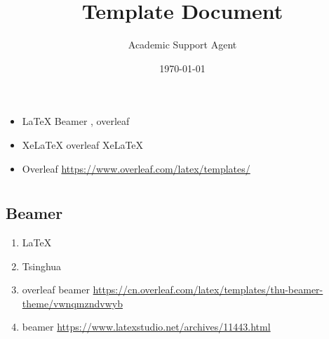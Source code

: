 \documentclass{article}
\title{Template Document}
\author{Academic Support Agent}
\date{\today}
\begin{document}
\maketitle

%  
    \kaishu {}
	
	\begin{frame}
		\titlepage
	\end{frame}
	
	\begin{frame}
		
	\end{frame}
		
	
	\section{ }
	
		\begin{frame}
			\begin{itemize}[<+-| alert@+>] 
				\item  \LaTeX{} Beamer ,  overleaf 
				\item   Xe\LaTeX{}   \qquad  overleaf  Xe\LaTeX{} 
				\item Overleaf  \url{https://www.overleaf.com/latex/templates/} 
			\end{itemize}
		\end{frame}
	
	\section{ }
	    \subsection{Beamer }	
	    
		\begin{frame}
			\begin{enumerate}
				\item<1->   \LaTeX{}  
				\item<2->  Tsinghua 
				\item<3->  overleaf beamer  \newline \url{https://cn.overleaf.com/latex/templates/thu-beamer-theme/vwnqmzndvwyb}
				\item<4->  beamer  
				\newline
				\url{https://www.latexstudio.net/archives/11443.html}
			\end{enumerate}	
		\end{frame}
	
\end{document}
